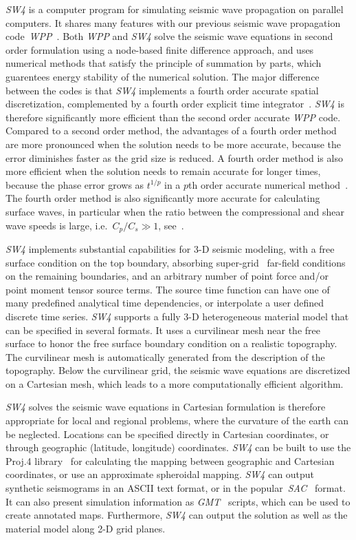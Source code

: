 \documentclass[11pt]{report}
\begin{document}
\emph{SW4} is a computer program for simulating seismic wave propagation on parallel computers. It
shares many features with our previous seismic wave propagation code~\emph{WPP}~\cite{WPP2}. Both
\emph{WPP} and \emph{SW4} solve the seismic wave equations in second order formulation using a
node-based finite difference approach, and uses numerical methods that satisfy the principle of
summation by parts, which guarentees energy stability of the numerical solution. The major
difference between the codes is that \emph{SW4} implements a fourth order accurate spatial
discretization, complemented by a fourth order explicit time integrator~\cite{SjoPet-12}. \emph{SW4}
is therefore significantly more efficient than the second order accurate \emph{WPP} code. Compared
to a second order method, the advantages of a fourth order method are more pronounced when the
solution needs to be more accurate, because the error diminishes faster as the grid size is
reduced. A fourth order method is also more efficient when the solution needs to remain accurate for
longer times, because the phase error grows as $t^{1/p}$ in a $p$th order accurate numerical
method~\cite{Gustafsson-Kreiss-Oliger}. The fourth order method is also significantly more accurate
for calculating surface waves, in particular when the ratio between the compressional and shear wave
speeds is large, i.e.~$C_p/C_s\gg 1$, see~\cite{KrePet-12}.

\emph{SW4} implements substantial capabilities for 3-D seismic modeling, with a free surface
condition on the top boundary, absorbing super-grid~\cite{PetSjo-13} far-field conditions on the
remaining boundaries, and an arbitrary number of point force and/or point moment tensor source
terms. The source time function can have one of many predefined analytical time dependencies, or
interpolate a user defined discrete time series. \emph{SW4} supports a fully 3-D heterogeneous
material model that can be specified in several formats. It uses a curvilinear mesh near the free
surface to honor the free surface boundary condition on a realistic topography. The curvilinear mesh
is automatically generated from the description of the topography. Below the curvilinear grid, the
seismic wave equations are discretized on a Cartesian mesh, which leads to a more computationally
efficient algorithm. 

\emph{SW4} solves the seismic wave equations in Cartesian formulation is therefore appropriate for
local and regional problems, where the curvature of the earth can be neglected. Locations can
be specified directly in Cartesian coordinates, or through geographic (latitude, longitude)
coordinates. \emph{SW4} can be built to use the Proj.4 library~\cite{Proj4} for calculating the
mapping between geographic and Cartesian coordinates, or use an approximate spheroidal
mapping. \emph{SW4} can output synthetic seismograms in an ASCII text format, or in the
popular~\emph{SAC}~\cite{Goldstein-et-al} format. It can also present simulation information as
\emph{GMT}~\cite{WesselSmithGMT} scripts, which can be used to create annotated maps. Furthermore,
\emph{SW4} can output the solution as well as the material model along 2-D grid planes.
\end{document}
